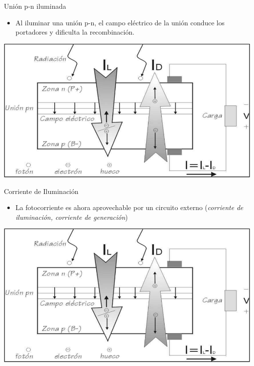\documentclass[xcolor={usenames,svgnames,dvipsnames}]{beamer}
\begin{document}
\begin{frame}[label={sec:org969fd57}]{Unión p-n iluminada}
\begin{itemize}
\item Al \alert{iluminar una unión p-n}, el \alert{campo eléctrico} de la unión conduce los portadores y \alert{dificulta la recombinación}.
\end{itemize}


\begin{center}
\includegraphics[width=.9\linewidth]{../figs/CelulaSolar.pdf}
\end{center}
\end{frame}

\begin{frame}[label={sec:org1571a78}]{Corriente de Iluminación}
\begin{itemize}
\item La \alert{fotocorriente} es ahora \alert{aprovechable} por un circuito externo (\emph{corriente de iluminación, corriente de generación})
\end{itemize}


\begin{center}
\includegraphics[width=.9\linewidth]{../figs/CelulaSolar.pdf}
\end{center}
\end{frame}
\end{document}
